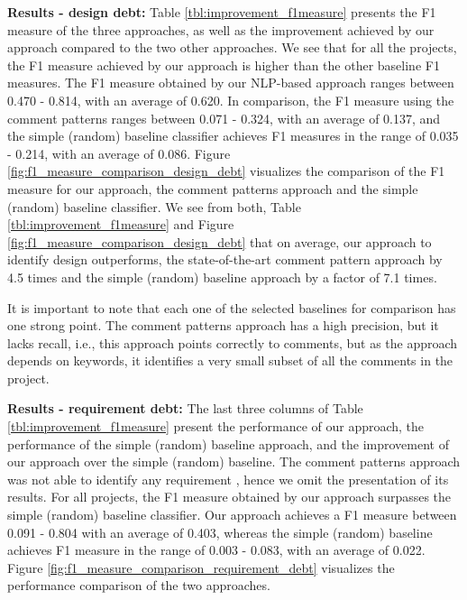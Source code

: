 \vspace{1mm}

\noindent \textbf{Results - design debt:} Table \ref{tbl:improvement_f1measure} presents the F1 measure of the three approaches, as well as the improvement achieved by our approach compared to the two other approaches. We see that for all the projects, the F1 measure achieved by our approach is higher than the other baseline F1 measures. The F1 measure obtained by our NLP-based approach ranges between 0.470 - 0.814, with an average of 0.620. In comparison, the F1 measure using the comment patterns ranges between 0.071 - 0.324, with an average of 0.137, and the simple (random) baseline classifier achieves F1 measures in the range of 0.035 - 0.214, with an average of 0.086. Figure \ref{fig:f1_measure_comparison_design_debt} visualizes the comparison of the F1 measure for our approach, the comment patterns approach and the simple (random) baseline classifier. We see from both, Table \ref{tbl:improvement_f1measure} and Figure \ref{fig:f1_measure_comparison_design_debt} that on average, our approach to identify design \SATD outperforms, the state-of-the-art comment pattern approach by 4.5 times and the simple (random) baseline approach by a factor of 7.1 times. 

It is important to note that each one of the selected baselines for comparison has one strong point. The comment patterns approach has a high precision, but it lacks recall, i.e., this approach points correctly to \SATD comments, but as the approach depends on keywords, it identifies a very small subset of all the \SATD comments in the project.


 
\noindent \textbf{Results - requirement debt:}  The last three columns of Table \ref{tbl:improvement_f1measure} present the performance of our approach, the performance of the simple (random) baseline approach, and the improvement of our approach over the simple (random) baseline. The comment patterns approach was not able to identify any requirement \SATD, hence we omit the presentation of its results. For all projects, the F1 measure obtained by our approach surpasses the simple (random) baseline classifier. Our approach achieves a F1 measure between 0.091 - 0.804 with an average of 0.403, whereas the simple (random) baseline achieves F1 measure in the range of 0.003 - 0.083, with an average of 0.022. Figure \ref{fig:f1_measure_comparison_requirement_debt} visualizes the performance comparison of the two approaches.

